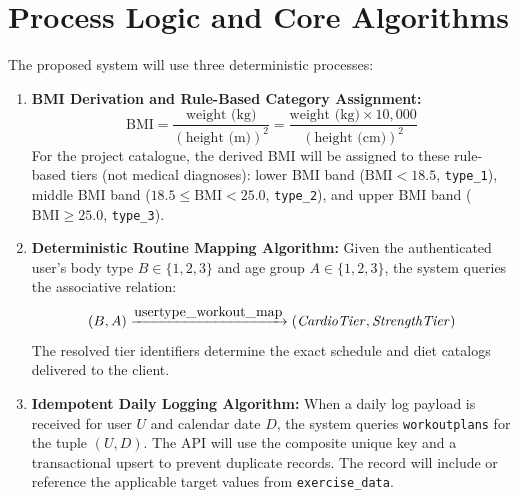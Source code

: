 \documentclass[11pt,a4paper]{report}
\begin{document}
\section{Process Logic and Core Algorithms}
The proposed system will use three deterministic processes:
\begin{enumerate}
  \item \textbf{BMI Derivation and Rule-Based Category Assignment:}
  \begin{equation}
    \text{BMI} = \frac{\text{weight (kg)}}{(\text{height (m)})^2} = \frac{\text{weight (kg)} \times 10{,}000}{(\text{height (cm)})^2}
  \end{equation}
  For the project catalogue, the derived BMI will be assigned to these rule-based tiers (not medical diagnoses): lower BMI band ($\text{BMI} < 18.5$, \texttt{type\_1}), middle BMI band ($18.5 \le \text{BMI} < 25.0$, \texttt{type\_2}), and upper BMI band ($\text{BMI} \ge 25.0$, \texttt{type\_3}).
  \item \textbf{Deterministic Routine Mapping Algorithm:} Given the authenticated user's body type $B \in \{1, 2, 3\}$ and age group $A \in \{1, 2, 3\}$, the system queries the associative relation:
  \begin{equation}
    (B, A) \xrightarrow{\text{\normalsize usertype\_workout\_map}} (\mathit{CardioTier}, \mathit{StrengthTier})
  \end{equation}
  The resolved tier identifiers determine the exact schedule and diet catalogs delivered to the client.
  \item \textbf{Idempotent Daily Logging Algorithm:} When a daily log payload is received for user $U$ and calendar date $D$, the system queries \texttt{workoutplans} for the tuple $(U, D)$. The API will use the composite unique key and a transactional upsert to prevent duplicate records. The record will include or reference the applicable target values from \texttt{exercise\_data}.
\end{enumerate}

\end{document}
